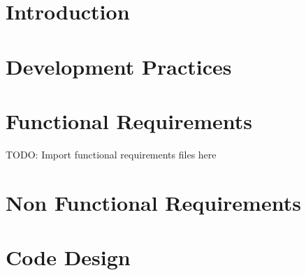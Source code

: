 



\chapter{Introduction}








\chapter{Development Practices}







\chapter{Functional Requirements}


TODO: Import functional requirements files here






\newpage



\chapter{Non Functional Requirements}




\chapter{Code Design}






